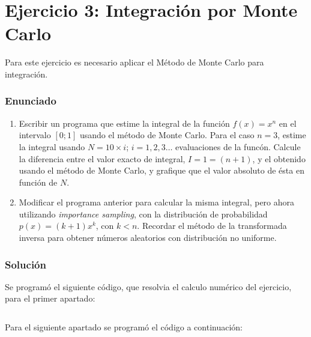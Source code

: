 \documentclass[a4paper,10pt]{paper}
\begin{document}
\section{Ejercicio 3: Integraci\'on por Monte Carlo}
Para este ejercicio es necesario aplicar el M\'etodo de Monte Carlo para integraci\'on.

\subsubsection{Enunciado}
\begin{enumerate}
 \item Escribir un programa  que  estime  la  integral  de  la  funci\'on $f(x)  =x^n$ en  el intervalo 
 $[0;1]$ usando el m\'etodo de Monte Carlo. Para el caso $n= 3$, 
 estime la integral usando $N=10\times i$; $i= 1, 2, 3 \ldots $
evaluaciones de la func\'on. Calcule la diferencia entre el valor exacto de integral, 
$I= 1=(n+ 1)$, y el obtenido usando el m\'etodo de Monte Carlo, 
y grafique que el valor absoluto de \'esta en funci\'on de $N$. 
  \item Modificar el programa anterior para calcular la misma integral, pero ahora utilizando
  \textit{importance sampling}, con la distribuci\'on de probabilidad $p(x) = (k+1) x^k$, con $k<n$. 
  Recordar el m\'etodo de la transformada inversa para obtener n\'umeros aleatorios con distribuci\'on
  no uniforme.
\end{enumerate}
 
\subsubsection{Soluci\'on}
Se program\'o el siguiente c\'odigo, que resolvia el calculo num\'erico del ejercicio, para el primer
apartado:
\inputminted[firstline=16, linenos, firstnumber=1]{fortran}{../ej3a.f90}

Para el siguiente apartado se program\'o el c\'odigo a continuaci\'on:
\inputminted[firstline=16, linenos, firstnumber=1]{fortran}{../ej3b.f90}
\end{document}
